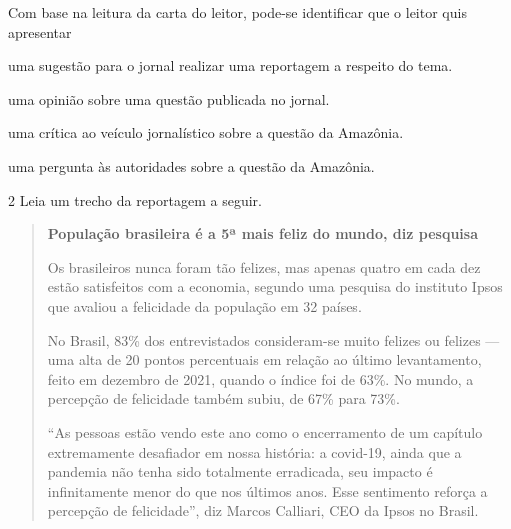 Com base na leitura da carta do leitor, pode-se identificar que o leitor
quis apresentar

\begin{escolha}
\item uma sugestão para o jornal realizar uma reportagem a respeito do tema.

\item uma opinião sobre uma questão publicada no jornal.

\item uma crítica ao veículo jornalístico sobre a questão da Amazônia.

\item uma pergunta às autoridades sobre a questão da Amazônia.
\end{escolha}


\num{2} Leia um trecho da reportagem a seguir.

\begin{quote}
\textbf{População brasileira é a 5ª mais feliz do mundo, diz pesquisa}

Os brasileiros nunca foram tão felizes, mas apenas quatro em cada dez
estão satisfeitos com a economia, segundo uma pesquisa do instituto
Ipsos que avaliou a felicidade da população em 32 países.

No Brasil, 83\% dos entrevistados consideram-se muito felizes ou felizes
--- uma alta de 20 pontos percentuais em relação ao último levantamento,
feito em dezembro de 2021, quando o índice foi de 63\%. No mundo, a
percepção de felicidade também subiu, de 67\% para 73\%.

``As pessoas estão vendo este ano como o encerramento de um capítulo
extremamente desafiador em nossa história: a covid-19, ainda que a
pandemia não tenha sido totalmente erradicada, seu impacto é
infinitamente menor do que nos últimos anos. Esse sentimento reforça a
percepção de felicidade'', diz Marcos Calliari, CEO da Ipsos no Brasil.

\end{quote}

